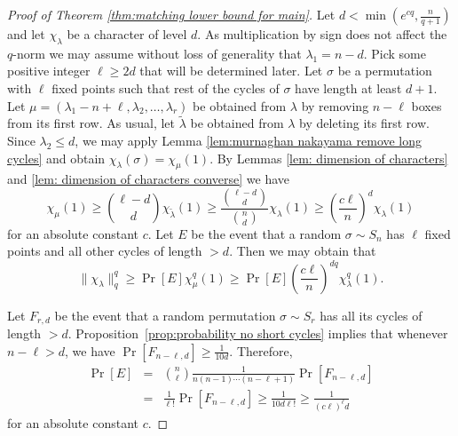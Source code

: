 \documentclass[11pt, letterpaper]{amsart}
\newcommand{\remove}[1]{}
\renewcommand\ge{\geqslant}
\renewcommand\le{\leqslant}
\begin{document}
\begin{proof}[Proof of Theorem \ref{thm:matching lower bound for main}]
Let $d < \min(e^{cq},\frac{n}{q+1})$ and let $\chi_{\lambda}$ be a character of level $d$. As multiplication by sign does not affect the $q$-norm we may assume without loss of generality that $\lambda_1 = n-d$. Pick some positive integer $\ell \ge 2d$ that will be determined later. Let $\sigma$ be a permutation with $\ell$ fixed points such that rest of the cycles of $\sigma$ have length at least $d+1$. Let $\mu = (\lambda_1 - n + \ell, \lambda_2, \ldots, \lambda_r)$ be obtained from $\lambda$ by removing $n-\ell$ boxes from its first row. As usual, let $\tilde{\lambda}$ be obtained from $\lambda$ by deleting its first row. Since $\lambda_2 \le d$, we may apply Lemma \ref{lem:murnaghan nakayama remove long cycles} and obtain $\chi_{\lambda}(\sigma) = \chi_{\mu}(1)$.
By Lemmas \ref{lem: dimension of characters} and \ref{lem: dimension of characters converse} we have
\[\chi_{\mu}(1)\ge \binom{\ell-d}{d} \chi_{\tilde{\lambda}}(1)\ge \frac{\binom{\ell-d}{d}}{\binom{n}{d}} \chi_{\lambda}(1)\ge \left(\frac{c\ell}{n}\right)^d \chi_{\lambda}(1)\]
for an absolute constant $c$. Let $E$ be the event that a random $\sigma\sim S_n$ has $\ell$ fixed points and all other cycles of length $>d$. Then we may %
obtain that
\[
\| \chi_{\lambda} \|_q^q \ge \Pr[E] \chi^q_\mu(1) \ge \Pr[E] \left(\frac{c\ell}{n}\right)^{dq}\chi^q_{\lambda}(1). 
\]

Let $F_{r,d}$ be the event that a random permutation $\sigma\sim S_r$ has all its cycles of length $>d$. Proposition~\ref{prop:probability no short cycles} implies that whenever $n-\ell > d$, we have $\Pr[F_{n-\ell,d}]\ge \frac{1}{10d}$. Therefore,
\begin{eqnarray*}
\Pr[E] &=& \binom{n}{\ell}\frac{1}{n(n-1)\cdots (n-\ell +1)}\Pr[F_{n-\ell,d}] \\
       &=& \frac{1}{\ell!}\Pr[F_{n-\ell,d}] \ge \frac{1}{10d \ell!} \ge \frac{1}{ (c\ell)^\ell d}
\end{eqnarray*}
for an absolute constant $c$.

\remove{It therefore remains to lower bound $\Pr[F_{n-l}]$. %
The distribution of the cycle decomposition of a random permutation in $S_r$ is identical to the distribution of a random sequence $(i_1,i_2,\dots)$ obtained by the following process: First choose a random $i_1\sim [r]$, then repeat the process recursively with $r-i_1$ in place of $r$ to obtain $(i_2,\dots)$. This follows easily from the fact that the length of the cycle of the element $r$ is uniform, and that when removing its cycle we get a uniformly random permutation on the remaining elements. 

}
\end{proof}
\end{document}
